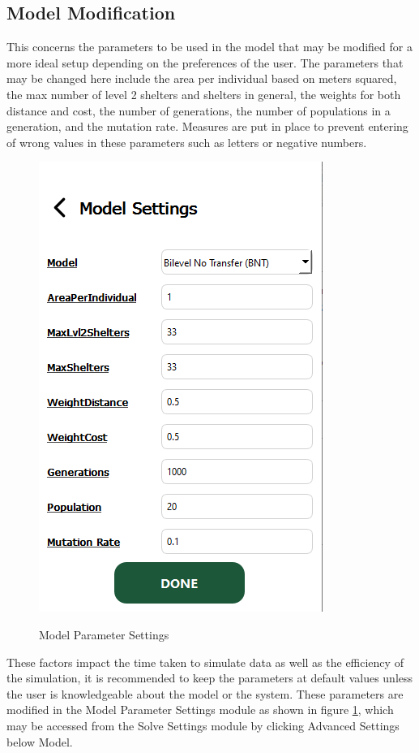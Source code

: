\documentclass[12pt,a4paper,]{article}
\begin{document}
	\subsection{Model Modification}
	This concerns the parameters to be used in the model that may be modified for a more ideal setup depending on the preferences of the user. The parameters that may be changed here include the area per individual based on meters squared, the max number of level 2 shelters and shelters in general, the weights for both distance and cost, the number of generations, the number of populations in a generation, and the mutation rate. Measures are put in place to prevent entering of wrong values in these parameters such as letters or negative numbers. 
	
	\begin{figure}[h!]
		\caption{Model Parameter Settings}
		\centering
		\includegraphics[width=\columnwidth]{Chapter 4/modelsettings}
		\label{modelSet}
	\end{figure}
	These factors impact the time taken to simulate data as well as the efficiency of the simulation, it is recommended to keep the parameters at default values unless the user is knowledgeable about the model or the system. These parameters are modified in the Model Parameter Settings module as shown in figure \ref{modelSet}, which may be accessed from the Solve Settings module by clicking Advanced Settings below Model.
	
\end{document}
